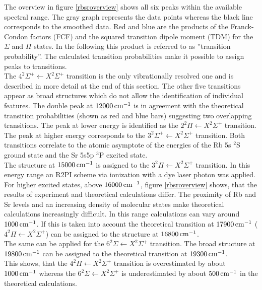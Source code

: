\documentclass[parskip,12pt,headsepline,a4paper] {scrbook}
\begin{document}
The overview in figure \ref{rbsroverview} shows all six peaks within the available spectral range. The gray graph represents the data points whereas the black line corresponds to the smoothed data. Red and blue are the products of the Franck-Condon factors (FCF) and the squared transition dipole moment (TDM) for the $\Sigma$ and $\Pi$ states. In the following this product is referred to as ''transition probability''. The calculated transition probabilities make it possible to assign peaks to transitions. \\
The $4 ^2\Sigma^+ \leftarrow X ^2\Sigma^+$ transition is the only vibrationally resolved one and is described in more detail at the end of this section. The other five transitions appear as broad structures which do not allow the identification of individual features. The double peak at $\unit[12000]{cm^{-1}}$ is in agreement with the theoretical transition probabilities (shown as red and blue bars) suggesting two overlapping transitions. The peak at lower energy is identified as the $2 ^2\Pi \leftarrow X ^2\Sigma^+$ transition. The peak at higher energy corresponds to the $3 ^2\Sigma^+ \leftarrow X ^2\Sigma^+$ transition. Both transitions correlate to the atomic asymptote of the energies of the Rb 5s $^2$S ground state and the Sr 5s5p $^3$P excited state. \\
The structure at $\unit[15000]{cm^{-1}}$ is assigned to the $3 ^2\Pi \leftarrow X ^2\Sigma^+$ transition. In this energy range an R2PI scheme via ionization with a dye laser photon was applied. \\
For higher excited states, above $\unit[16000]{cm^{-1}}$, figure \ref{rbsroverview} shows, that the results of experiment and theoretical calculations differ. The proximity of Rb and Sr levels and an increasing density of molecular states make theoretical calculations increasingly difficult. In this range calculations can vary around $\unit[1000]{cm^{-1}}$. If this is taken into account the theoretical transition at $\unit[17900]{cm^{-1}}$ ($4 ^2\Pi \leftarrow X ^2\Sigma^+$) can be assigned to the structure at $\unit[16800]{cm^{-1}}$. \\
The same can be applied for the $6 ^2\Sigma \leftarrow X ^2\Sigma^+$ transition. The broad structure at $\unit[19800]{cm^{-1}}$ can be assigned to the theoretical transition at $\unit[19300]{cm^{-1}}$. \\
This shows, that the $4 ^2\Pi \leftarrow X ^2\Sigma^+$ transition is overestimated by about $\unit[1000]{cm^{-1}}$ whereas the $6 ^2\Sigma \leftarrow X ^2\Sigma^+$ is underestimated by about $\unit[500]{cm^{-1}}$ in the theoretical calculations.
\end{document}
